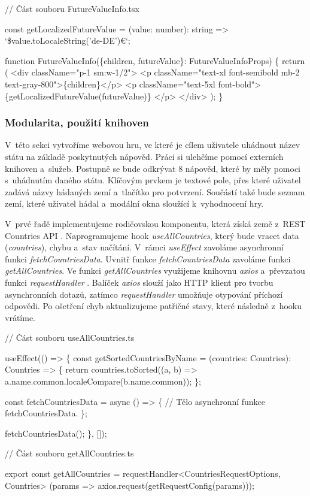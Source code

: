 \begin{prog}
// Část souboru FutureValueInfo.tsx

const getLocalizedFutureValue = (value: number): string => 
  `\${value.toLocaleString('de-DE')}€`;

function FutureValueInfo(\{children, futureValue\}: FutureValueInfoProps) \{
  return (
    <div className="p-1 sm:w-1/2">
      <p className="text-xl font-semibold mb-2 text-gray-800">\{children\}</p>
      <p className="text-5xl font-bold">
        \{getLocalizedFutureValue(futureValue)\}
      </p>
    </div>
  );
\}
\end{prog}

\subsubsection*{Modularita, použití knihoven}

V~této sekci vytvoříme webovou hru, ve které je cílem uživatele uhádnout název státu na základě poskytnutých nápověd. Práci si ulehčíme pomocí externích knihoven a~služeb.
Postupně se bude odkrývat 8 nápověd, které by měly pomoci s~uhádnutím daného státu. Klíčovým prvkem je textové pole, přes které uživatel zadává názvy hádaných zemí a~tlačítko pro potvrzení. 
Součástí také bude seznam zemí, které uživatel hádal a~modální okna sloužící k~vyhodnocení hry.

V~prvé řadě implementujeme rodičovskou komponentu, která získá země z~REST Countries API \cite{restcountriesapi}. Naprogramujeme hook \emph{useAllCountries}, který bude vracet data (\emph{countries}), chybu a~stav načítání. 
V~rámci \emph{useEffect} zavoláme asynchronní funkci \emph{fetchCountriesData}. Uvnitř funkce \emph{fetchCountriesData} zavoláme funkci \emph{getAllCountries}. 
Ve funkci \emph{getAllCountries} využijeme knihovnu \emph{axios} \cite{axioslib} a~převzatou funkci \emph{requestHandler} \cite{axiosrequesthandler}. 
Balíček \emph{axios} slouží jako HTTP klient pro tvorbu asynchronních dotazů, zatímco \emph{requestHandler} umožňuje otypování příchozí odpovědi. Po ošetření chyb aktualizujeme patřičné stavy, které následně z~hooku vrátíme. 

\begin{prog}
// Část souboru useAllCountries.ts

useEffect(() => \{
  const getSortedCountriesByName = (countries: Countries): Countries => \{
    return countries.toSorted((a, b) => 
      a.name.common.localeCompare(b.name.common));
  \};

  const fetchCountriesData = async () => \{
    // Tělo asynchronní funkce fetchCountriesData.
  \};

  fetchCountriesData();
\}, []);

// Část souboru getAllCountries.ts

export const getAllCountries = requestHandler<CountriesRequestOptions, Countries>
  (params => axios.request(getRequestConfig(params)));
\end{prog}

